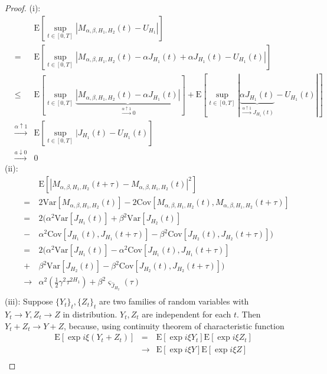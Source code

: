 \documentclass[a4paper, twoside, 11pt]{article}
\theoremstyle{definition}
\begin{document}
  \begin{proof}
(i): 
\begin{eqnarray*}
  &&\mathrm{E}[\sup\limits_{t\in[0,T]}|M_{\alpha,\beta,H_1,H_2}(t) - U_{H_1}|]\\
  &=&\mathrm{E} [\sup\limits_{t\in[0,T]}|M_{\alpha,\beta,H_1,H_2}(t) - \alpha J_{H_1}(t) + \alpha J_{H_1}(t) - U_{H_1}(t)|]\\
  &\le&\mathrm{E} [\sup\limits_{t\in[0,T]}\underbrace{|M_{\alpha,\beta,H_1,H_2}(t) - \alpha J_{H_1}(t)|}_{\overset{\alpha\uparrow 1}{\rightarrow}0 }] + \mathrm{E} [\sup\limits_{t\in[0,T]}|\underbrace{\alpha J_{H_1}(t)}_{\overset{\alpha\uparrow 1}{\rightarrow} J_{H_1}(t)} - U_{H_1}(t)|]\\ 
  &\overset{\alpha\uparrow 1}{\rightarrow}&  \mathrm{E} [\sup\limits_{t\in[0,T]}|J_{H_1}(t) - U_{H_1}(t)]\\
	&\overset{a\downarrow 0}{\rightarrow}& 0
\end{eqnarray*}
(ii):
\begin{eqnarray*}
	&& \mathrm{E}[|M_{\alpha, \beta, H_1, H_2}(t+\tau) - M_{\alpha, \beta, H_1, H_2}(t)|^2]\\
	&=& 2\mathrm{Var}[M_{\alpha, \beta, H_1, H_2}(t)] - 2\mathrm{Cov}[M_{\alpha, \beta, H_1, H_2}(t), M_{\alpha, \beta, H_1, H_2}(t+\tau)]\\
	&=& 2(\alpha^2\mathrm{Var}[J_{H_1}(t)] + \beta^2\mathrm{Var}[J_{H_2}(t)]  \\
	&-& \alpha^2\mathrm{Cov}[J_{H_1}(t), J_{H_1}(t+\tau)] - \beta^2\mathrm{Cov}[J_{H_2}(t), J_{H_2}(t+\tau)])\\
    &=&  2(\alpha^2\mathrm{Var}[J_{H_1}(t)] - \alpha^2\mathrm{Cov}[J_{H_1}(t), J_{H_1}(t+\tau)] \\
	&+& \beta^2\mathrm{Var}[J_{H_2}(t)] - \beta^2\mathrm{Cov}[J_{H_2}(t), J_{H_2}(t+\tau)])\\
	&\rightarrow& \alpha^2(\frac{1}{2}\gamma^2 \tau^{2H_1}) + \beta^2\varsigma_{\hat{J}_{H_2}}(\tau)  \\
\end{eqnarray*}
(iii): Suppose $\{Y_t\}_t, \{Z_t\}_t$ are two families of random variables with $Y_t \rightarrow Y, Z_t \rightarrow Z$ in distribution. $Y_t, Z_t$ are independent for each $t$. Then  $Y_t + Z_t \rightarrow Y+Z$, because, using continuity theorem of characteristic function
\begin{eqnarray*}
  \mathrm{E}[\exp{i\xi(Y_t+Z_t)}]&=& \mathrm{E}[\exp{i\xi Y_t}]\mathrm{E}[\exp{i\xi Z_t}]\\
  &\rightarrow& \mathrm{E}[\exp{i\xi Y}] \mathrm{E}[\exp{i\xi Z}]\\

\end{eqnarray*}
\end{proof}
\end{document}
